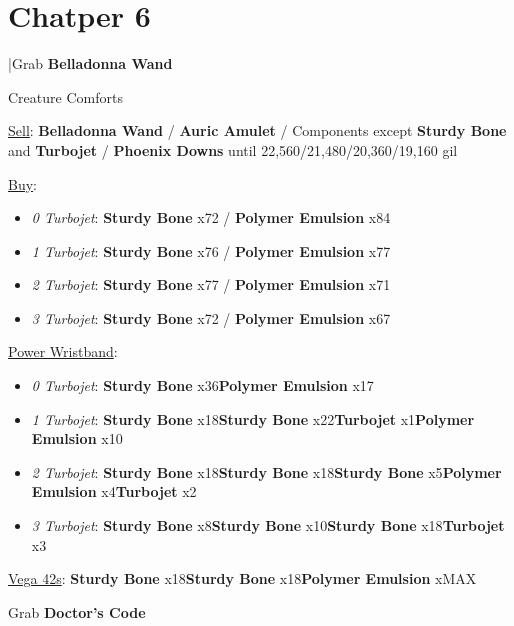 \section{Chatper 6}
\begin{mainlist}
	\item \skip|Grab \textbf{Belladonna Wand}
\end{mainlist}
\begin{shop}{Creature Comforts}
	\item \underline{Sell}: \textbf{Belladonna Wand} / \textbf{Auric Amulet} / Components except \textbf{Sturdy Bone} and \textbf{Turbojet} / \textbf{Phoenix Downs} until 22,560/21,480/20,360/19,160 gil
	\item \underline{Buy}:
	\begin{itemize}
		\item \textit{0 Turbojet}: \textbf{Sturdy Bone} x72 / \textbf{Polymer Emulsion} x84
		\item \textit{1 Turbojet}: \textbf{Sturdy Bone} x76 / \textbf{Polymer Emulsion} x77
		\item \textit{2 Turbojet}: \textbf{Sturdy Bone} x77 / \textbf{Polymer Emulsion} x71
		\item \textit{3 Turbojet}: \textbf{Sturdy Bone} x72 / \textbf{Polymer Emulsion} x67
	\end{itemize}
\end{shop}
\begin{upgrade}
	\item \underline{Power Wristband}:
	\begin{itemize}
		\item \textit{0 Turbojet}: \textbf{Sturdy Bone} x36\to \textbf{Polymer Emulsion} x17
		\item \textit{1 Turbojet}: \textbf{Sturdy Bone} x18\to \textbf{Sturdy Bone} x22\to \textbf{Turbojet} x1\to \textbf{Polymer Emulsion} x10
		\item \textit{2 Turbojet}: \textbf{Sturdy Bone} x18\to \textbf{Sturdy Bone} x18\to \textbf{Sturdy Bone} x5\to \textbf{Polymer Emulsion} x4\to \textbf{Turbojet} x2
		\item \textit{3 Turbojet}: \textbf{Sturdy Bone} x8\to \textbf{Sturdy Bone} x10\to \textbf{Sturdy Bone} x18\to \textbf{Turbojet} x3
	\end{itemize}
	\item \underline{Vega 42s}: \textbf{Sturdy Bone} x18\to \textbf{Sturdy Bone} x18\to \textbf{Polymer Emulsion} xMAX
\end{upgrade}
\begin{mainlist}
	\item Grab \textbf{Doctor's Code}
\end{mainlist}
